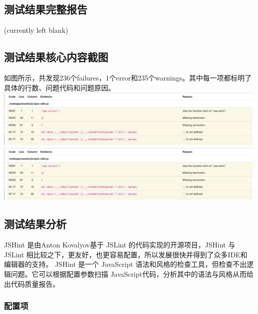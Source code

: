 \documentclass[hyperref, a4paper]{ctexart}
\begin{document}
\hypertarget{ux6d4bux8bd5ux7ed3ux679cux5b8cux6574ux62a5ux544a-2}{%
\subsection{测试结果完整报告}\label{ux6d4bux8bd5ux7ed3ux679cux5b8cux6574ux62a5ux544a-2}}

(currently left blank)

\hypertarget{ux6d4bux8bd5ux7ed3ux679cux6838ux5fc3ux5185ux5bb9ux622aux56fe-2}{%
\subsection{测试结果核心内容截图}\label{ux6d4bux8bd5ux7ed3ux679cux6838ux5fc3ux5185ux5bb9ux622aux56fe-2}}

如图所示，共发现236个failures，1个error和235个warnings。其中每一项都标明了具体的行数、问题代码和问题原因。
\includegraphics{screenshots/pic3.jpg}
\includegraphics{screenshots/pic3.jpg}

\hypertarget{ux6d4bux8bd5ux7ed3ux679cux5206ux6790-2}{%
\subsection{测试结果分析}\label{ux6d4bux8bd5ux7ed3ux679cux5206ux6790-2}}

JSHint 是由Anton Kovalyov基于 JSLint 的代码实现的开源项目，JSHint 与
JSLint
相比较之下，更友好，也更容易配置，所以发展很快并得到了众多IDE和编辑器的支持。
JSHint 是一个 JavaScript
语法和风格的检查工具，但检查不出逻辑问题。它可以根据配置参数扫描
JavaScript代码，分析其中的语法与风格从而给出代码质量报告。

\hypertarget{ux914dux7f6eux9879}{%
\subsubsection{配置项}\label{ux914dux7f6eux9879}}
\end{document}
